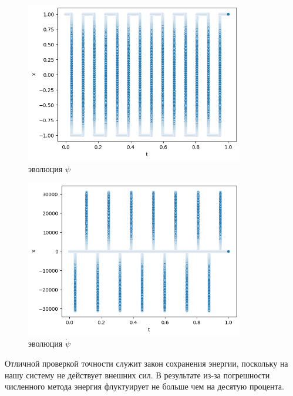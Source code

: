 \documentclass[a4paper, 12pt]{article}
\begin{document}
    \begin{figure}[H]
  \centering
  \includegraphics[width = 0.85\textwidth, height = 0.20\textheight]{pictures/data/image copy 5.png}
  \caption{эволюция $\psi$}
 \end{figure}

    \begin{figure}[H]
  \centering
  \includegraphics[width = 0.85\textwidth, height = 0.20\textheight]{pictures/data/image copy 6.png}
  \caption{эволюция $\dot{\psi}$}
 \end{figure}
    
Отличной проверкой точности служит закон сохранения энергии, поскольку на нашу систему не действует внешних сил. В результате из-за погрешности численного метода энергия флуктуирует не больше чем на десятую процента.

    
 \newpage
 
\end{document}
